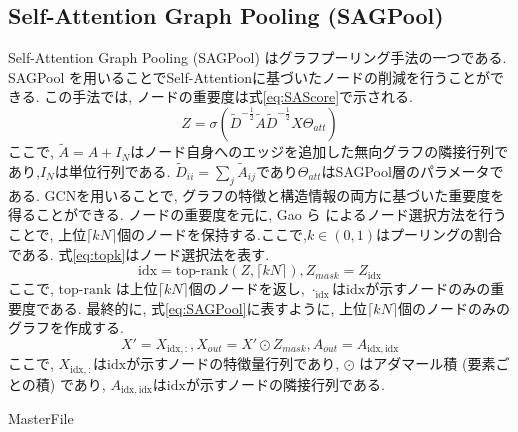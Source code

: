 \documentclass[a4j,twoside,12pt,dvipdfmx]{thesis} %
\begin{document}
\subsection{Self-Attention Graph Pooling (SAGPool)}
Self-Attention Graph Pooling (SAGPool) \cite{lee2019self} はグラフプーリング手法の一つである. SAGPool を用いることでSelf-Attentionに基づいたノードの削減を行うことができる. この手法では, ノードの重要度は式\ref{eq:SAScore}で示される.
\begin{equation}
  \label{eq:SAScore}
  Z = \sigma (\tilde{D}^{-\frac{1}{2}}\tilde{A}\tilde{D}^{-\frac{1}{2}}X\Theta_{att})
\end{equation}
ここで, $\tilde{A} = A + I_{N}$はノード自身へのエッジを追加した無向グラフの隣接行列であり,$I_N$は単位行列である.
$\tilde{D}_{ii} = \sum_{j} \tilde{A}_{ij}$であり$\Theta_{att}$はSAGPool層のパラメータである.
GCNを用いることで, グラフの特徴と構造情報の両方に基づいた重要度を得ることができる.
ノードの重要度を元に, Gao ら\cite{gao2019proceedings} によるノード選択方法を行うことで, 上位$\lceil kN \rceil$個のノードを保持する.ここで,$k \in (0,1)$はプーリングの割合である. 式\ref{eq:topk}はノード選択法を表す.
\begin{equation}
  \label{eq:topk}
  \mathrm{idx} = \textrm{top-rank}(Z, \lceil kN \rceil ), Z_{mask} = Z_{\mathrm{idx}}
\end{equation}
ここで, $\textrm{top-rank}$ は上位$\lceil kN \rceil$個のノードを返し, $\cdot_{\mathrm{idx}}$は$\mathrm{idx}$が示すノードのみの重要度である.
最終的に, 式\ref{eq:SAGPool}に表すように, 上位$\lceil kN \rceil$個のノードのみのグラフを作成する.
\begin{equation}
  \label{eq:SAGPool}
  X' = X_{\mathrm{idx},:}, X_{out} = X' \odot Z_{mask}, A_{out} = A_{\mathrm{idx,idx}}
\end{equation}
ここで, $X_{\mathrm{idx},:}$は$\mathrm{idx}$が示すノードの特徴量行列であり, $\odot$ はアダマール積 (要素ごとの積) であり, $A_{\mathrm{idx,idx}}$は$\mathrm{idx}$が示すノードの隣接行列である.

\expandafter\ifx\csname MasterFile\endcsname\relax
\def\MasterFile{本原稿です}

%



\end{document}
